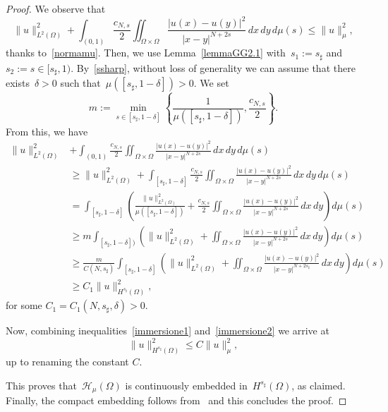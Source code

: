 \documentclass[12pt,a4paper,intlimits,sumlimits]{amsart}
\theoremstyle{definition}
\theoremstyle{plain}
\numberwithin{equation}{section}
\renewcommand{\leq}{\leqslant}
\renewcommand{\geq}{\geqslant}
\renewcommand{\ge}{\geqslant}
\begin{document}
\begin{proof}
We observe that 
\begin{equation}\label{immersione1}
\|u\|_{L^2(\Omega)}^2 +\int_{(0,1)} \frac{c_{N, s}}{2}\iint_{\Omega\times \Omega}
\frac{|u(x)-u(y)|^2}{|x-y|^{N+2s}}\,dx\,dy\,d\mu(s)
\leq \|u\|_\mu^2,
\end{equation}
thanks to~\eqref{normamu}.
Then, we use Lemma~\ref{lemmaGG2.1} with~$s_1:=s_\sharp$ and~$s_2:=s\in [s_\sharp,1)$. By~\eqref{ssharp}, without loss of generality we can assume that there exists~$\delta>0$ such that~$\mu([s_{\sharp}, 1-\delta])>0$.  
We set
\[
m:= \min_{s\in [s_\sharp, 1-\delta]}\left\{\frac{1}{\mu ([s_\sharp, 1-\delta])}, \frac{c_{N, s}}{2} \right\}.
\]
{F}rom this, we have
\begin{equation}\label{immersione2}
\begin{aligned}
\|u\|_{L^2(\Omega)}^2 &+\int_{(0,1)}\frac{c_{N, s}}{2}\iint_{\Omega\times \Omega}\frac{|u(x)-u(y)|^2}{|x-y|^{N+2s}}\,dx\,dy\,d\mu(s)\\
&\ge \|u\|_{L^2(\Omega)}^2 +\int_{[s_\sharp,1-\delta]}\frac{c_{N, s}}{2}\iint_{\Omega\times \Omega}
\frac{|u(x)-u(y)|^2}{|x-y|^{N+2s}}\,dx\,dy\,d\mu(s)\\
&=\int_{[s_\sharp,1-\delta]} \left(\frac{\|u\|_{L^2(\Omega)}^2}{\mu ([s_\sharp, 1-\delta])} + \frac{c_{N, s}}{2} \iint_{\Omega\times \Omega} \frac{|u(x)-u(y)|^2}{|x-y|^{N+2s}}\,dx\,dy \right) d\mu(s)\\
&\ge m \int_{[s_\sharp, 1-\delta])} \left( \|u\|_{L^2(\Omega)}^2 + \iint_{\Omega\times \Omega}\frac{|u(x)-u(y)|^2}{|x-y|^{N+2s}}\,dx\,dy\right) d\mu(s)\\
&\ge \frac{m}{C(N, s_\sharp)} \int_{[s_\sharp,1-\delta]} \left( \|u\|_{L^2(\Omega)}^2 + \iint_{\Omega\times \Omega}\frac{|u(x)-u(y)|^2}{|x-y|^{N+2s_\sharp}}\,dx\,dy\right) d\mu(s)\\
&\geq C_1 \|u\|_{H^{s_\sharp}(\Omega)}^2,
\end{aligned}
\end{equation}
for some $C_1 = C_1 (N, s_\sharp, \delta)>0$. 

Now, combining inequalities~\eqref{immersione1} and~\eqref{immersione2} we arrive at
\[
\|u\|_{H^{s_\sharp}(\Omega)}^2\leq C \|u\|_\mu^2,
\]
up to renaming the constant $C$.

This proves that~$\mathcal{H}_\mu(\Omega)$ is continuously embedded in~$H^{s_\sharp}(\Omega)$, as claimed.  Finally, the compact embedding follows from~\cite[Corollary 7.2]{MR2944369} and this concludes the proof.
\end{proof}
\end{document}
